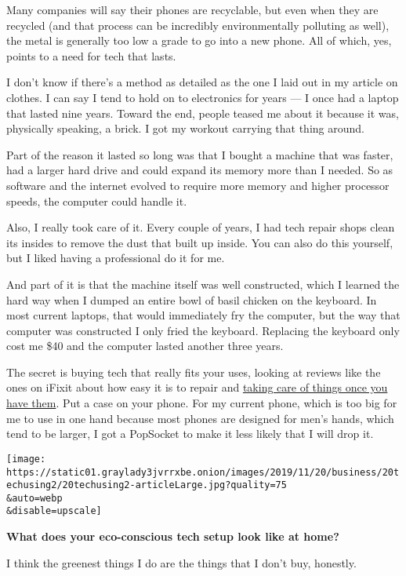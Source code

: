 Many companies will say their phones are recyclable, but even when they
are recycled (and that process can be incredibly environmentally
polluting as well), the metal is generally too low a grade to go into a
new phone. All of which, yes, points to a need for tech that lasts.

I don't know if there's a method as detailed as the one I laid out in my
article on clothes. I can say I tend to hold on to electronics for years
--- I once had a laptop that lasted nine years. Toward the end, people
teased me about it because it was, physically speaking, a brick. I got
my workout carrying that thing around.

Part of the reason it lasted so long was that I bought a machine that
was faster, had a larger hard drive and could expand its memory more
than I needed. So as software and the internet evolved to require more
memory and higher processor speeds, the computer could handle it.

Also, I really took care of it. Every couple of years, I had tech repair
shops clean its insides to remove the dust that built up inside. You can
also do this yourself, but I liked having a professional do it for me.

And part of it is that the machine itself was well constructed, which I
learned the hard way when I dumped an entire bowl of basil chicken on
the keyboard. In most current laptops, that would immediately fry the
computer, but the way that computer was constructed I only fried the
keyboard. Replacing the keyboard only cost me \$40 and the computer
lasted another three years.

The secret is buying tech that really fits your uses, looking at reviews
like the ones on iFixit about how easy it is to repair and
\href{https://www.nytimes3xbfgragh.onion/2016/04/21/technology/personaltech/choosing-to-skipthe-upgrade-and-care-for-the-gadget-youve-got.html}{taking
care of things once you have them}. Put a case on your phone. For my
current phone, which is too big for me to use in one hand because most
phones are designed for men's hands, which tend to be larger, I got a
PopSocket to make it less likely that I will drop it.

\texttt{[image: https://static01.graylady3jvrrxbe.onion/images/2019/11/20/business/20techusing2/20techusing2-articleLarge.jpg?quality=75\\\&auto=webp\\\&disable=upscale]}

\textbf{What does your eco-conscious tech setup look like at home?}

I think the greenest things I do are the things that I don't buy,
honestly.

